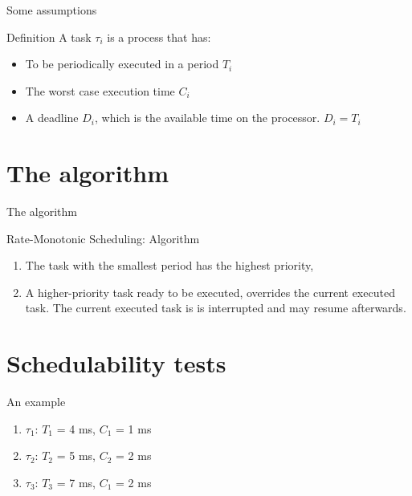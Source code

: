 \documentclass{beamer}
\begin{document}
\begin{frame}{Some assumptions}
\begin{block}{Definition}
A task $\tau_i$ is a process that has:
\begin{itemize}
        \item To be periodically executed in a period $T_i$       
         \item The worst case execution time $C_i$
        \item A deadline $D_i$, which is the available time on the processor. $D_i = T_i$
        \end{itemize}
\end{block}
    
\end{frame}


\section{The algorithm}

\begin{frame}{The algorithm}


\begin{block}{Rate-Monotonic Scheduling: Algorithm}
\begin{enumerate}
  \item The task with the smallest period has the highest priority,
  \item A higher-priority task ready to be executed, overrides the current 
  executed task. The current executed task is is interrupted and may resume 
  afterwards.
\end{enumerate}\end{block}

\end{frame}


\section{Schedulability tests}
\begin{frame}{An example}
\begin{block}{}
  \begin{enumerate}
    \item $\tau_1$: $T_1$ = 4 ms,  $C_1$ = 1 ms 
        \item $\tau_2$: $T_2$ = 5 ms,  $C_2$ = 2 ms
             \item  $\tau_3$: $T_3$ = 7 ms,   $C_1$ = 2 ms 
  \end{enumerate}
\end{block}
\end{frame}
\end{document}
